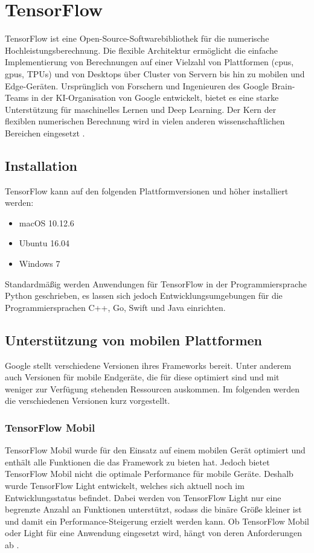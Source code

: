 \section{TensorFlow}\label{sec:tensorflow}
TensorFlow ist eine Open-Source-Softwarebibliothek für die numerische Hochleistungsberechnung. Die flexible Architektur ermöglicht die einfache Implementierung von Berechnungen auf einer Vielzahl von Plattformen (\ac{cpu}s, \ac{gpu}s, TPUs) und von Desktops über Cluster von Servern bis hin zu mobilen und Edge-Geräten. Ursprünglich von Forschern und Ingenieuren des Google Brain-Teams in der KI-Organisation von Google entwickelt, bietet es eine starke Unterstützung für maschinelles Lernen und Deep Learning. Der Kern der flexiblen numerischen Berechnung wird in vielen anderen wissenschaftlichen Bereichen eingesetzt \cite{tensorflow}.

\subsection{Installation}
TensorFlow kann auf den folgenden Plattformversionen und höher installiert werden: 
\begin{itemize}
	\item macOS 10.12.6 
	\item Ubuntu 16.04 
	\item Windows 7 
\end{itemize}

Standardmäßig werden Anwendungen für TensorFlow in der Programmiersprache Python geschrieben, es lassen sich jedoch Entwicklungsumgebungen für die Programmiersprachen C++, Go, Swift und Java einrichten.

\subsection{Unterstützung von mobilen Plattformen}
Google stellt verschiedene Versionen ihres Frameworks bereit. Unter anderem auch Versionen für mobile Endgeräte, die für diese optimiert sind und mit weniger zur Verfügung stehenden Ressourcen auskommen. Im folgenden werden die verschiedenen Versionen kurz vorgestellt.

\subsubsection{TensorFlow Mobil}
TensorFlow Mobil wurde für den Einsatz auf einem mobilen Gerät optimiert und enthält alle Funktionen die das Framework zu bieten hat. Jedoch bietet TensorFlow Mobil nicht die optimale Performance für mobile Geräte. Deshalb wurde TensorFlow Light entwickelt, welches sich aktuell noch im Entwicklungsstatus befindet. Dabei werden von TensorFlow Light nur eine begrenzte Anzahl an Funktionen unterstützt, sodass die binäre Größe kleiner ist und damit ein Performance-Steigerung erzielt werden kann. Ob TensorFlow Mobil oder Light für eine Anwendung eingesetzt wird, hängt von deren Anforderungen ab \cite{tensorflow}. 

